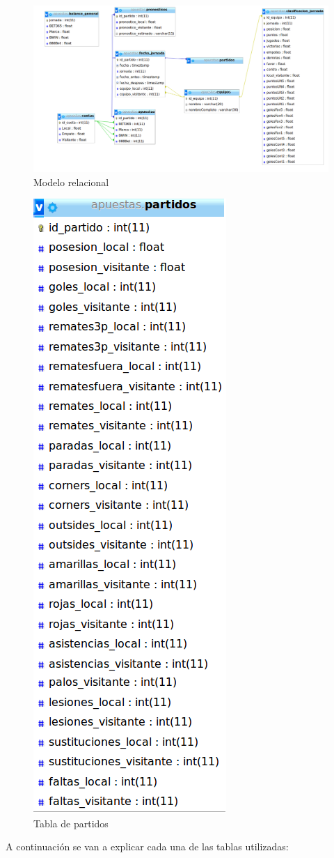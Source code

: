 \begin{figure}
\centering
\includegraphics[width=.9\textwidth]{img/modelo_relacional}
\caption{Modelo relacional}
\label{fig:ModRel}
\end{figure}

\begin{figure}
\centering
\includegraphics[width=.3\textwidth]{img/modelo_relacional_partidos}
\caption{Tabla de partidos}
\label{fig:ModRelPar}
\end{figure}

A continuación se van a explicar cada una de las tablas utilizadas:

